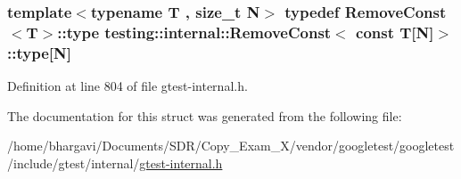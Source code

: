 \subsubsection[{\texorpdfstring{type}{type}}]{\setlength{\rightskip}{0pt plus 5cm}template$<$typename T , size\+\_\+t N$>$ typedef {\bf Remove\+Const}$<${\bf T}$>$\+::type {\bf testing\+::internal\+::\+Remove\+Const}$<$ const {\bf T}\mbox{[}N\mbox{]}$>$\+::type\mbox{[}N\mbox{]}}\hypertarget{structtesting_1_1internal_1_1_remove_const_3_01const_01_t[_n]_4_ac976b53cb5d031a120fafbe790650068}{}\label{structtesting_1_1internal_1_1_remove_const_3_01const_01_t[_n]_4_ac976b53cb5d031a120fafbe790650068}


Definition at line 804 of file gtest-\/internal.\+h.



The documentation for this struct was generated from the following file\+:\begin{DoxyCompactItemize}
\item 
/home/bhargavi/\+Documents/\+S\+D\+R/\+Copy\+\_\+\+Exam\+\_\+X/vendor/googletest/googletest/include/gtest/internal/\hyperlink{gtest-internal_8h}{gtest-\/internal.\+h}\end{DoxyCompactItemize}
